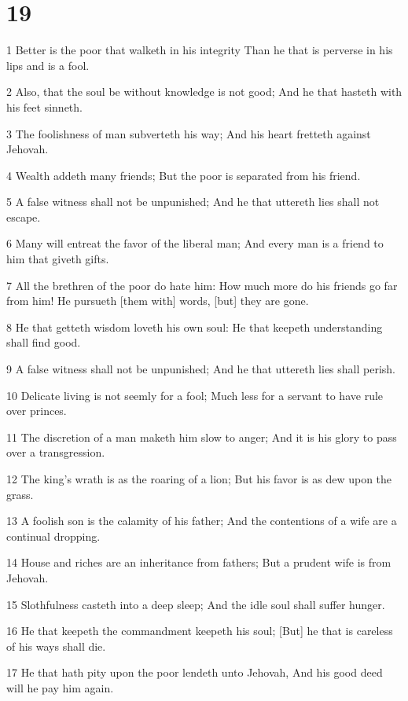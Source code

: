 \chapter{19}

\par 1 Better is the poor that walketh in his integrity Than he that is perverse in his lips and is a fool.
\par 2 Also, that the soul be without knowledge is not good; And he that hasteth with his feet sinneth.
\par 3 The foolishness of man subverteth his way; And his heart fretteth against Jehovah.
\par 4 Wealth addeth many friends; But the poor is separated from his friend.
\par 5 A false witness shall not be unpunished; And he that uttereth lies shall not escape.
\par 6 Many will entreat the favor of the liberal man; And every man is a friend to him that giveth gifts.
\par 7 All the brethren of the poor do hate him: How much more do his friends go far from him! He pursueth [them with] words, [but] they are gone.
\par 8 He that getteth wisdom loveth his own soul: He that keepeth understanding shall find good.
\par 9 A false witness shall not be unpunished; And he that uttereth lies shall perish.
\par 10 Delicate living is not seemly for a fool; Much less for a servant to have rule over princes.
\par 11 The discretion of a man maketh him slow to anger; And it is his glory to pass over a transgression.
\par 12 The king's wrath is as the roaring of a lion; But his favor is as dew upon the grass.
\par 13 A foolish son is the calamity of his father; And the contentions of a wife are a continual dropping.
\par 14 House and riches are an inheritance from fathers; But a prudent wife is from Jehovah.
\par 15 Slothfulness casteth into a deep sleep; And the idle soul shall suffer hunger.
\par 16 He that keepeth the commandment keepeth his soul; [But] he that is careless of his ways shall die.
\par 17 He that hath pity upon the poor lendeth unto Jehovah, And his good deed will he pay him again.
